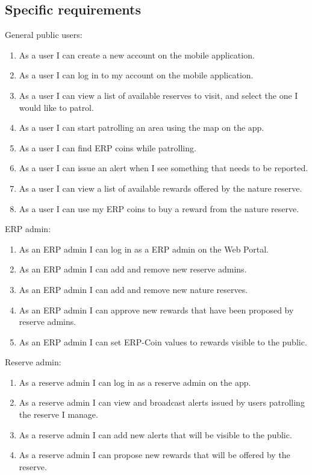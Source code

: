 \documentclass{article}
\begin{document}
\subsection{Specific requirements}
General public users:
\begin{enumerate}
    \item As a user I can create a new account on the mobile application.
    \item As a user I can log in to my account on the mobile application.
    \item As a user I can view a list of available reserves to visit, and select the one I would like to patrol.
    \item As a user I can start patrolling an area using the map on the app.
    \item As a user I can find ERP coins while patrolling.
    \item As a user I can issue an alert when I see something that needs to be reported.
    \item As a user I can view a list of available rewards offered by the nature reserve.
    \item As a user I can use my ERP coins to buy a reward from the nature reserve.
\end{enumerate}
\vspace{3em}
ERP admin:
\begin{enumerate}
    \item As an ERP admin I can log in as a ERP admin on the Web Portal.
    \item As an ERP admin I can add and remove new reserve admins.
    \item As an ERP admin I can add and remove new nature reserves.
    \item As an ERP admin I can approve new rewards that have been proposed by reserve admins.
    \item As an ERP admin I can set ERP-Coin values to rewards visible to the public.
\end{enumerate}
\vspace{2em}
Reserve admin:
\begin{enumerate}
    \item As a reserve admin I can log in as a reserve admin on the app.
    \item As a reserve admin I can view and broadcast alerts issued by users patrolling the reserve I manage.
    \item As a reserve admin I can add new alerts that will be visible to the public.
    \item As a reserve admin I can propose new rewards that will be offered by the reserve.
\end{enumerate}
\end{document}
